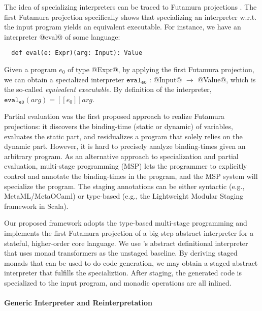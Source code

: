 The idea of specializing interpreters can be traced to Futamura
projections \cite{Futamura1999, futamura1971partial}.
The first Futamura projection specifically shows that
specializing an interpreter w.r.t. the input program yields an
equivalent executable.  For instance, we have an interpreter @eval@ of
some language:
\begin{lstlisting}
  def eval(e: Expr)(arg: Input): Value
\end{lstlisting}
Given a program $e_0$ of type @Expr@, by applying the first Futamura
projection, we can obtain a specialized interpreter
$\texttt{eval}_{\texttt{e0}}$ : @Input@ $\to$ @Value@, which is the so-called
\textit{equivalent executable}. By definition of the interpreter,
$\texttt{eval}_{\texttt{e0}}(arg) = [\![ e_0 ]\!] arg $.

Partial evaluation \cite{DBLP:books/daglib/0072559} was the first
proposed approach to realize Futamura projections: it discovers the
binding-time (static or dynamic) of variables, evaluates the static
part, and residualizes a program that solely relies on the dynamic
part. However, it is hard to precisely analyze binding-times given an
arbitrary program. As an alternative approach to specialization and
partial evaluation, multi-stage programming (MSP) \cite{taha1999multi, DBLP:conf/pepm/TahaS97}
lets the programmer to explicitly control and annotate the
binding-times in the program, and the MSP system will specialize the
program. The staging annotations can be either syntactic (e.g.,
MetaML/MetaOCaml) or type-based (e.g., the Lightweight Modular Staging framework
\cite{DBLP:conf/gpce/RompfO10} in Scala).

Our proposed framework adopts the type-based multi-stage programming
and implements the first Futamura projection of a big-step abstract
interpreter for a stateful, higher-order core language.  We use
\citet{DBLP:journals/pacmpl/DaraisLNH17}'s abstract definitional
interpreter that uses monad transformers as the unstaged baseline. By
deriving staged monads that can be used to do code generation, we may
obtain a staged abstract interpreter that fulfills the specializtion.
After staging, the generated code is specialized to the input program,
and monadic operations are all inlined.



\paragraph{Generic Interpreter and Reinterpretation}

